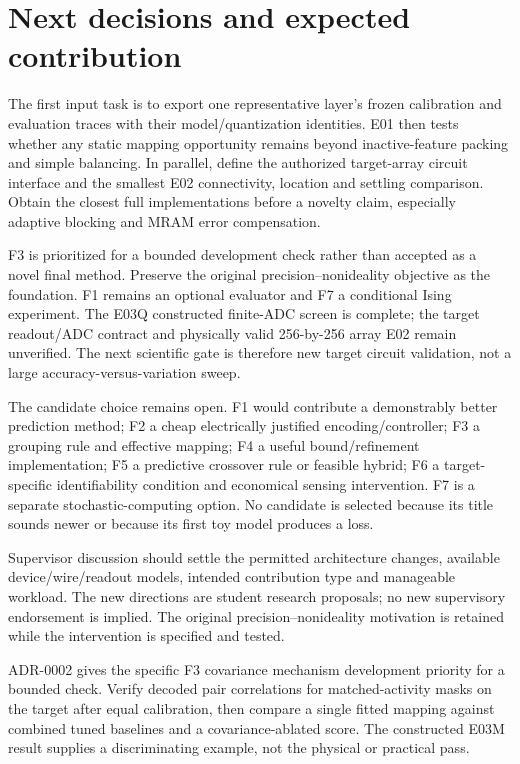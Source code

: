 \section{Next decisions and expected contribution}

The first input task is to export one representative layer's frozen calibration and
evaluation traces with their model/quantization identities. E01 then tests whether any
static mapping opportunity remains beyond inactive-feature packing and simple balancing.
In parallel, define the authorized target-array circuit interface and the smallest E02
connectivity, location and settling comparison. Obtain the closest full implementations
before a novelty claim, especially adaptive blocking and MRAM error compensation.

F3 is prioritized for a bounded development check rather than accepted as a novel
final method. Preserve the original precision--nonideality objective as the
foundation. F1 remains an optional evaluator and F7 a conditional Ising experiment.
The E03Q constructed finite-ADC screen is complete; the target readout/ADC
contract and physically valid 256-by-256 array E02 remain unverified. The next
scientific gate is therefore new target circuit validation, not a large
accuracy-versus-variation sweep.

The candidate choice remains open. F1 would contribute a demonstrably better prediction
method; F2 a cheap electrically justified encoding/controller; F3 a grouping rule and
effective mapping; F4 a useful bound/refinement implementation; F5 a predictive crossover
rule or feasible hybrid; F6 a target-specific identifiability condition and economical
sensing intervention. F7 is a separate stochastic-computing option. No candidate is
selected because its title sounds newer or because its first toy model produces a loss.

Supervisor discussion should settle the permitted architecture changes, available
device/wire/readout models, intended contribution type and manageable workload. The
new directions are student research proposals; no new supervisory endorsement is implied.
The original precision--nonideality motivation is retained while the intervention is
specified and tested.

ADR-0002 gives the specific F3 covariance mechanism development priority for a bounded
check. Verify decoded pair correlations for matched-activity masks on the target after
equal calibration, then compare a single fitted mapping against combined tuned baselines
and a covariance-ablated score. The constructed E03M result supplies a discriminating
example, not the physical or practical pass.

